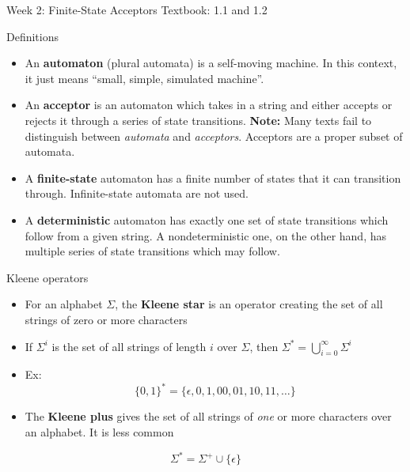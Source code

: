 \begin{frame}{Week 2: Finite-State Acceptors}
\protect\hypertarget{week-2-finite-state-acceptors}{}
Textbook: 1.1 and 1.2
\end{frame}

\begin{frame}{Definitions}
\protect\hypertarget{definitions}{}
\begin{itemize}
\item
  An \textbf{automaton} (plural automata) is a self-moving machine. In
  this context, it just means ``small, simple, simulated machine''.
\item
  An \textbf{acceptor} is an automaton which takes in a string and
  either accepts or rejects it through a series of state transitions.
  \textbf{Note:} Many texts fail to distinguish between \emph{automata}
  and \emph{acceptors}. Acceptors are a proper subset of automata.
\item
  A \textbf{finite-state} automaton has a finite number of states that
  it can transition through. Infinite-state automata are not used.
\item
  A \textbf{deterministic} automaton has exactly one set of state
  transitions which follow from a given string. A nondeterministic one,
  on the other hand, has multiple series of state transitions which may
  follow.
\end{itemize}
\end{frame}

\begin{frame}{Kleene operators}
\protect\hypertarget{kleene-operators}{}
\begin{itemize}
\item
  For an alphabet \(\Sigma\), the \textbf{Kleene star} is an operator
  creating the set of all strings of zero or more characters
\item
  If \(\Sigma^i\) is the set of all strings of length \(i\) over
  \(\Sigma\), then \(\Sigma^* = \bigcup_{i = 0}^\infty \Sigma^i\)
\item
  Ex: \[
    \{ 0, 1 \}^* = \{ \epsilon, 0, 1, 00, 01, 10, 11, \ldots \}
    \]
\item
  The \textbf{Kleene plus} gives the set of all strings of \emph{one} or
  more characters over an alphabet. It is less common
\end{itemize}

\[
\Sigma^* = \Sigma^+ \cup \{ \epsilon \}
\]
\end{frame}

